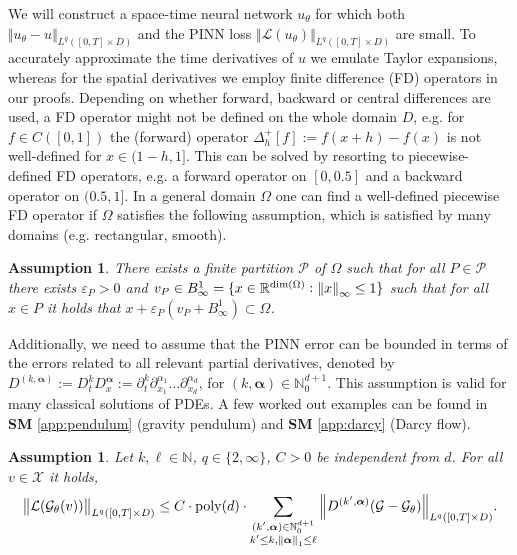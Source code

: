 \documentclass{article}
\numberwithin{equation}{section}
\newcommand{\poly}{\mathrm{poly}}
\newcommand{\R}{\mathbb{R}}
\newcommand{\N}{\mathbb{N}}
\newcommand{\cG}{\mathcal{G}}
\newcommand{\cL}{\mathcal{L}}
\newcommand{\cP}{\mathcal{P}}
\newcommand{\cX}{\mathcal{X}}
\newcommand{\bmalpha}{{\bm{\alpha}}}
\renewcommand{\epsilon}{\varepsilon}
\newcommand{\1}{\mathbbm{1}}
\newtheorem{assumption}[theorem]{Assumption}
\begin{document}
We will construct a space-time neural network $u_\theta$ for which both $\Vert u_\theta-u\Vert_{L^q([0,T]\times D)}$ and the PINN loss $\Vert\cL(u_\theta)\Vert_{L^q([0,T]\times D)}$ are small. To accurately approximate the time derivatives of $u$ we emulate Taylor expansions, whereas for the spatial derivatives we employ finite difference (FD) operators in our proofs. 
Depending on whether forward, backward or central differences are used, a FD operator might not be defined on the whole domain $D$, e.g. for $f\in C([0,1])$ the (forward) operator $\Delta^+_h[f] := f(x+h)-f(x)$ is not well-defined for $x\in (1-h,1]$. This can be solved by resorting to piecewise-defined FD operators, e.g. a forward operator on $[0,0.5]$ and a backward operator on $(0.5,1]$. In a general domain $\Omega$ one can find a well-defined piecewise FD operator if $\Omega$ satisfies the following assumption, which is satisfied by many domains (e.g. rectangular, smooth). 
\begin{assumption}\label{ass:partition}
There exists a finite partition $\cP$ of $\Omega$ such that for all $P\in\cP$ there exists $\epsilon_P>0$ and $v_P\in B^1_\infty = \{x\in\R^{\dim(\Omega)}: \norm{x}_\infty\leq 1\}$ such that for all $x\in P$ it holds that $x+\epsilon_P(v_P+B^1_\infty) \subset \Omega$. 
\end{assumption}
Additionally, we need to assume that the PINN error can be bounded in terms of the errors related to all relevant partial derivatives, denoted by $D^{(k,\bmalpha)}:=D^k_tD^\bmalpha_x := \partial_t^k \partial^{\alpha_1}_{x_1}\ldots \partial^{\alpha_d}_{x_d}$, for $(k,\bmalpha)\in\N_0^{d+1}$. {\color{black} This assumption is valid for many classical solutions of PDEs. A few worked out examples can be found in \textbf{SM} \ref{app:pendulum} (gravity pendulum) and \textbf{SM} \ref{app:darcy} (Darcy flow). }
\begin{assumption}\label{ass:diff-operator}
Let $k,\ell\in\N$,  $q\in\{2,\infty\}$, $C>0$ be independent from $d$. For all $v\in\cX$ it holds,
\begin{equation}
    \norm{\cL(\cG_\theta(v))}_{L^q([0,T]\times D)} \leq C \cdot \poly(d)\cdot 
    \sum_{\substack{(k',\bmalpha)\in\N^{d+1}_0\\ k'\leq k, \norm{\bmalpha}_1\leq \ell }} \norm{D^{(k',\bmalpha)}(\cG-\cG_\theta)}_{L^q([0,T]\times D)}. 
\end{equation}
\end{assumption}
\end{document}

